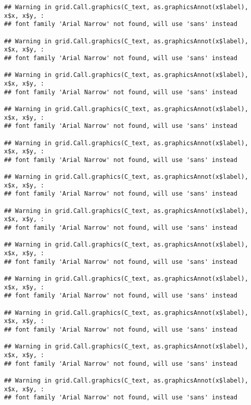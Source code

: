 \documentclass[
]{article}
\begin{document}
\begin{verbatim}
## Warning in grid.Call.graphics(C_text, as.graphicsAnnot(x$label), x$x, x$y, :
## font family 'Arial Narrow' not found, will use 'sans' instead

## Warning in grid.Call.graphics(C_text, as.graphicsAnnot(x$label), x$x, x$y, :
## font family 'Arial Narrow' not found, will use 'sans' instead

## Warning in grid.Call.graphics(C_text, as.graphicsAnnot(x$label), x$x, x$y, :
## font family 'Arial Narrow' not found, will use 'sans' instead

## Warning in grid.Call.graphics(C_text, as.graphicsAnnot(x$label), x$x, x$y, :
## font family 'Arial Narrow' not found, will use 'sans' instead

## Warning in grid.Call.graphics(C_text, as.graphicsAnnot(x$label), x$x, x$y, :
## font family 'Arial Narrow' not found, will use 'sans' instead

## Warning in grid.Call.graphics(C_text, as.graphicsAnnot(x$label), x$x, x$y, :
## font family 'Arial Narrow' not found, will use 'sans' instead

## Warning in grid.Call.graphics(C_text, as.graphicsAnnot(x$label), x$x, x$y, :
## font family 'Arial Narrow' not found, will use 'sans' instead

## Warning in grid.Call.graphics(C_text, as.graphicsAnnot(x$label), x$x, x$y, :
## font family 'Arial Narrow' not found, will use 'sans' instead

## Warning in grid.Call.graphics(C_text, as.graphicsAnnot(x$label), x$x, x$y, :
## font family 'Arial Narrow' not found, will use 'sans' instead

## Warning in grid.Call.graphics(C_text, as.graphicsAnnot(x$label), x$x, x$y, :
## font family 'Arial Narrow' not found, will use 'sans' instead

## Warning in grid.Call.graphics(C_text, as.graphicsAnnot(x$label), x$x, x$y, :
## font family 'Arial Narrow' not found, will use 'sans' instead

## Warning in grid.Call.graphics(C_text, as.graphicsAnnot(x$label), x$x, x$y, :
## font family 'Arial Narrow' not found, will use 'sans' instead
\end{verbatim}
\end{document}
